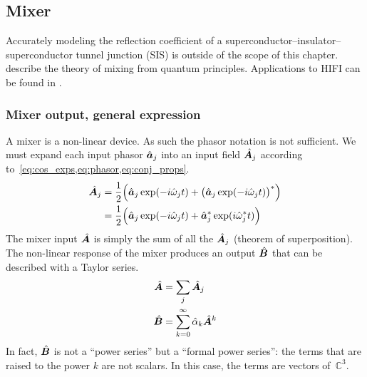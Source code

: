 \clearpage
\subsection{Mixer}
\label{sec:mixer_model}
Accurately modeling the reflection coefficient of a superconductor--insulator--superconductor tunnel junction (SIS) is outside of the scope of this chapter.
\Textcite{tucker1985quantum} describe the theory of mixing from quantum principles.
Applications to HIFI can be found in \textcite{kooi2008}.

\subsubsection{Mixer output, general expression}

A mixer is a non-linear device.
As such the phasor notation is not sufficient.
We must expand
each    input phasor $\hat{\bm{a}}_j$
into an input field  $\hat{\bm{A}}_j$
according to~\cref{eq:cos_exps,eq:phasor,eq:conj_props}.
\begin{align}
    \hat{\bm{A}}_j
    &=
    \frac{1}{2}
    \Big(
              \hat{\bm{a}}_j \exp(-i \hat{\omega}_j t)
        +
        \big( \hat{\bm{a}}_j \exp(-i \hat{\omega}_j t) \big)^*
    \Big) \notag
    \\
    &=
    \frac{1}{2}
    \Big(
              \hat{\bm{a}}_j \exp(-i \hat{\omega}_j t)
        +
              \hat{\bm{a}}_j^* \exp(i \hat{\omega}_j^* t)
    \Big)
\end{align}
The mixer input $\hat{\bm{A}}$ is simply the sum of all the $\hat{\bm{A}}_j$ (theorem of superposition).
The non-linear response of the mixer produces an output $\hat{\bm{B}}$ that can be described with a Taylor series.
\begin{align}
    \hat{\bm{A}} &= \sum_{j  }          \hat{\bm{A}}_j
    \\
    \hat{\bm{B}} &= \sum_{k=0}^{\infty} \hat{\alpha}_k \hat{\bm{A}}^k
\end{align}
In fact, $\hat{\bm{B}}$ is not a ``power series'' but a ``formal power series'': the terms that are raised to the power $k$ are not scalars.
In this case, the terms are vectors of~$\mathbb{C}^3$.

